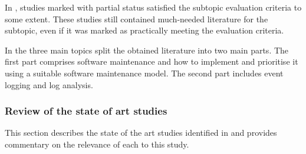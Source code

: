 In , studies marked with partial status satisfied the subtopic evaluation criteria to some extent. These studies still contained much-needed literature for the subtopic, even if it was marked as practically meeting the evaluation criteria. \par In  the three main topics split the obtained literature into two main parts. The first part comprises software maintenance and how to implement and prioritise it using a suitable software maintenance model. The second part includes event logging and log analysis. 

\clearpage

\subsubsection{Review of the state of art studies}
This section describes the state of the art studies identified in  and provides commentary on the relevance of each to this study.



\newcommand{\problemStatement}{Software maintenance is a problem in the industry due to how inefficiently developers prioritise maintenance activities. A proven method to monitor software behaviours is event logging. The logging mechanism and log analysis to improve software maintenance need to be explicitly designed for user-based events.}

\clearpage

